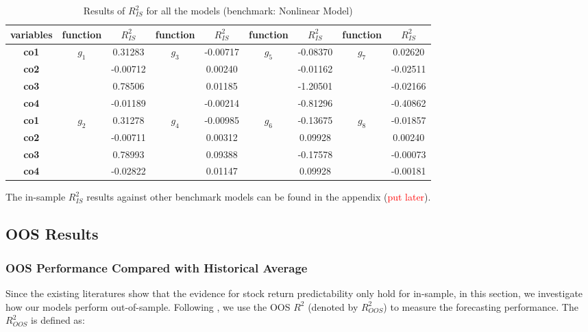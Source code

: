\documentclass[a4paper,12pt,times,numbered,print,index]{report}
\numberwithin{equation}{section}
\begin{document}
\begin{table}[!htbp]
	\centering
	\caption{Results of $R^2_{IS}$ for all the models (benchmark: Nonlinear Model)}
	\begin{adjustbox}{max width=\textwidth}
		\begin{tabular}{ccccccccc}
			\toprule
			\textbf{variables} & \textbf{function} & \textbf{$R^2_{IS}$} & \textbf{function} & \textbf{$R^2_{IS}$} & \textbf{function} & \textbf{$R^2_{IS}$} & \textbf{function} & \textbf{$R^2_{IS}$} \\
			\midrule
		\textbf{co1} & \multirow{4}[2]{*}{$g_1$} & 0.31283 & \multirow{4}[2]{*}{$g_3$} & -0.00717 & \multirow{4}[2]{*}{$g_5$} & -0.08370 & \multirow{4}[2]{*}{$g_7$} & 0.02620 \\
		\textbf{co2} &       & -0.00712 &       & 0.00240 &       & -0.01162 &       & -0.02511 \\
		\textbf{co3} &       & 0.78506 &       & 0.01185 &       & -1.20501 &       & -0.02166 \\
		\textbf{co4} &       & -0.01189 &       & -0.00214 &       & -0.81296 &       & -0.40862 \\
		\midrule
		\textbf{co1} & \multirow{4}[2]{*}{$g_2$} & 0.31278 & \multirow{4}[2]{*}{$g_4$} & -0.00985 & \multirow{4}[2]{*}{$g_6$} & -0.13675 & \multirow{4}[2]{*}{$g_8$} & -0.01857 \\
		\textbf{co2} &       & -0.00711 &       & 0.00312 &       & 0.09928 &       & 0.00240 \\
		\textbf{co3} &       & 0.78993 &       & 0.09388 &       & -0.17578 &       & -0.00073 \\
		\textbf{co4} &       & -0.02822 &       & 0.01147 &       & 0.09928 &       & -0.00181 \\
		\bottomrule
		\bottomrule
	\end{tabular}%
	\end{adjustbox}
	\label{ins_R2_NLS}%
\end{table}%

The in-sample $R^2_{IS}$ results against other benchmark models can be found in the appendix (\textcolor{red}{put later}). 

\subsection{OOS Results}

\subsubsection{OOS Performance Compared with Historical Average}
Since the existing literatures show that the evidence for stock return predictability only hold for in-sample, in this section, we investigate how our models perform out-of-sample. Following \cite{campbell2008predicting}, we use the OOS $R^2$ (denoted by $R^2_{OOS}$) to measure the forecasting performance. The $R^2_{OOS}$ is defined as:
\end{document}
